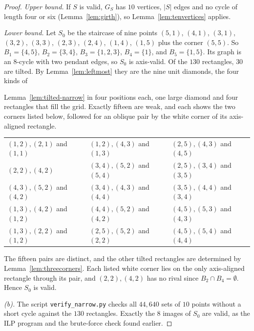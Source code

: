 \begin{proof}
\emph{Upper bound.} If $S$ is valid, $G_S$ has $10$ vertices, $|S|$ edges and no cycle of
length four or six (Lemma~\ref{lem:girth}), so Lemma~\ref{lem:tenvertices} applies.

\emph{Lower bound.} Let $S_0$ be the staircase of nine points $(5,1)$, $(4,1)$, $(3,1)$,
$(3,2)$, $(3,3)$, $(2,3)$, $(2,4)$, $(1,4)$, $(1,5)$ plus the corner $(5,5)$. So
$B_1=\{4,5\}$, $B_2=\{3,4\}$, $B_3=\{1,2,3\}$, $B_4=\{1\}$, and $B_5=\{1,5\}$. Its graph is an
$8$-cycle with two pendant edges, so $S_0$ is axis-valid. Of the $130$ rectangles, $30$ are
tilted. By Lemma~\ref{lem:leftmost} they are the nine unit diamonds, the four kinds of

Lemma~\ref{lem:tilted-narrow} in four positions each, one large diamond and four rectangles that
fill the grid. Exactly fifteen are weak, and each shows the two corners listed below, followed
for an oblique pair by the white corner of its axis-aligned rectangle.
\begin{center}\footnotesize
\begin{tabular}{@{}lll@{}}
$(1,2),(2,1)$ and $(1,1)$ & $(1,2),(4,3)$ and $(1,3)$ & $(2,5),(4,3)$ and $(4,5)$ \\
$(2,2),(4,2)$ & $(3,4),(5,2)$ and $(5,4)$ & $(2,5),(3,4)$ and $(3,5)$ \\
$(4,3),(5,2)$ and $(4,2)$ & $(3,4),(4,3)$ and $(4,4)$ & $(3,5),(4,4)$ and $(3,4)$ \\
$(1,3),(4,2)$ and $(1,2)$ & $(4,4),(5,2)$ and $(4,2)$ & $(4,5),(5,3)$ and $(4,3)$ \\
$(1,3),(2,2)$ and $(1,2)$ & $(2,5),(5,2)$ and $(2,2)$ & $(4,5),(5,4)$ and $(4,4)$ \\
\end{tabular}
\end{center}
The fifteen pairs are distinct, and the other tilted rectangles are determined by
Lemma~\ref{lem:threecorners}. Each listed white corner lies on the only axis-aligned rectangle
through its pair, and $(2,2),(4,2)$ has no rival since $B_2\cap B_4=\emptyset$. Hence $S_0$ is
valid.

\emph{(b).} The script \texttt{verify\_narrow.py} checks all $44{,}640$ sets of $10$ points
without a short cycle against the $130$ rectangles. Exactly the $8$ images of $S_0$ are valid,
as the ILP program and the brute-force check found earlier.
\end{proof}
